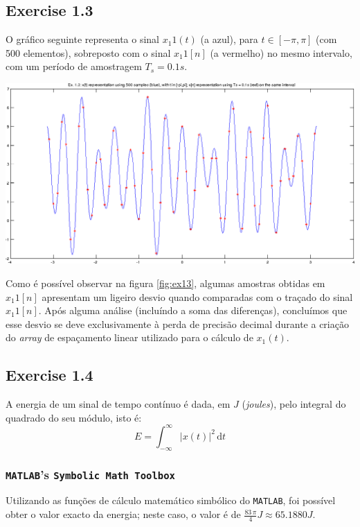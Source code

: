 \documentclass[a4paper]{article}
\begin{document}
\subsection{Exercise 1.3}
O gráfico seguinte representa o sinal $x_1{1}(t)$ (a azul), para $t \in [-\pi, \pi]$ (com 500 elementos), sobreposto com o sinal $x_1{1}[n]$ (a vermelho) no mesmo intervalo, com um período de amostragem $T_ {s} = 0.1s$.

\begin{center}
	\includegraphics[scale=0.45]{images/ex13.png}
	\label{fig:ex13}
\end{center}

\noindent Como é possível observar na figura \ref{fig:ex13}, algumas amostras obtidas em $x_1{1}[n]$ apresentam um ligeiro desvio quando comparadas com o traçado do sinal $x_1{1}[n]$. Após alguma análise (incluíndo a soma das diferenças), concluímos que esse desvio se deve exclusivamente à perda de precisão decimal durante a criação do \emph{array} de espaçamento linear utilizado para o cálculo de $x_{1}(t)$.

\subsection{Exercise 1.4}
\noindent A energia de um sinal de tempo contínuo é dada, em $J$ (\emph{joules}), pelo integral do quadrado do seu módulo, isto é:
\begin{equation}
E = \int_{-\infty}^{\infty} |x(t)|^2 \, \mathrm{d} t
\end{equation}

\subsubsection{\texttt{MATLAB}'s \texttt{Symbolic Math Toolbox}}
\noindent Utilizando as funções de cálculo matemático simbólico do \texttt{MATLAB}, foi possível obter o valor exacto da energia; neste caso, o valor é de $\frac{83 \, \pi}{4} J \approx 65.1880 J$.
\end{document}
